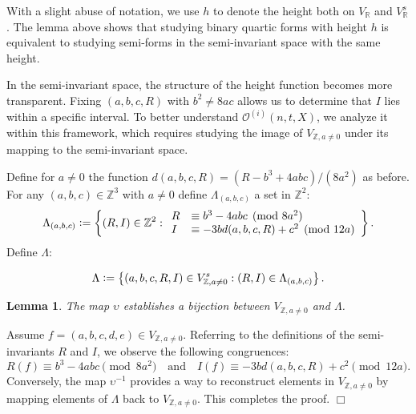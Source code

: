 \documentclass{article}
\def\Z{{\mathbb Z}}
\def\R{{\mathbb R}}
\def\Z{{\mathbb Z}}
\newtheorem{lemma}[theorem]{Lemma}
\newenvironment{proof}{\noindent {\bf Proof:}}{$\Box$ \vspace{2 ex}}
\def \Bo{{\mathcal{O}^{(i)}(n,t,X)}}
\begin{document}
With a slight abuse of notation, we use $h$ to denote the height both on $V_{\mathbb{R}}$ and $V_{\R}^{s}$. The lemma above shows that studying binary quartic forms with height $h$ is equivalent to studying semi-forms in the semi-invariant space with the same height.


In the semi-invariant space, the structure of the height function becomes more transparent. Fixing $(a, b, c, R)$ with $b^2 \neq 8ac$ allows us to determine that $I$ lies within a specific interval. To better understand $\Bo$, we analyze it within this framework, which requires studying the image of $V_{\mathbb{Z}, a \neq 0}$ under its mapping to the semi-invariant space.


Define for $a\ne0$ the function $d(a,b,c,R)=(R-b^3+4abc)/(8a^2)$ as before. For any $(a,b,c)\in \mathbb{Z}^3$ with $a\neq 0$ define $\Lambda_{(a,b,c)}$ a set in $\mathbb{Z}^2$:
\begin{equation*}
   \Lambda_{(a,b,c)} \vcentcolon = \left\{ (R,I)\in \mathbb{Z}^2 :
   \begin{array}{ll}
        R &\equiv b^3 - 4abc \pmod{8a^2} \\
        I &\equiv -3b d(a,b,c,R) + c^2 \pmod{12a}
   \end{array} 
   \right\}.
\end{equation*}
Define $\Lambda$:

\begin{equation*}
    \Lambda \vcentcolon = \left\{(a,b,c,R,I) \in V_{\Z, a\neq 0}^{s} :  (R,I) \in \Lambda_{(a,b,c)}\right\}.
\end{equation*}

 \begin{lemma}    
The map $\upsilon$ establishes a bijection between $V_{\mathbb{Z}, a \neq 0}$ and $\Lambda$.
 \end{lemma}
 \begin{proof}
Assume $f = (a, b, c, d, e) \in V_{\mathbb{Z}, a \neq 0}$. Referring to the definitions of the semi-invariants $R$ and $I$, we observe the following congruences:
\begin{equation*}
    R(f) \equiv b^3 - 4abc \pmod{8a^2} \quad \text{and} \quad I(f) \equiv -3b d(a, b, c, R) + c^2 \pmod{12a}.
\end{equation*}
Conversely, the map $\upsilon^{-1}$ provides a way to reconstruct elements in $V_{\mathbb{Z}, a \neq 0}$ by mapping elements of $\Lambda$ back to $V_{\mathbb{Z}, a \neq 0}$. This completes the proof.
\end{proof}
\end{document}
